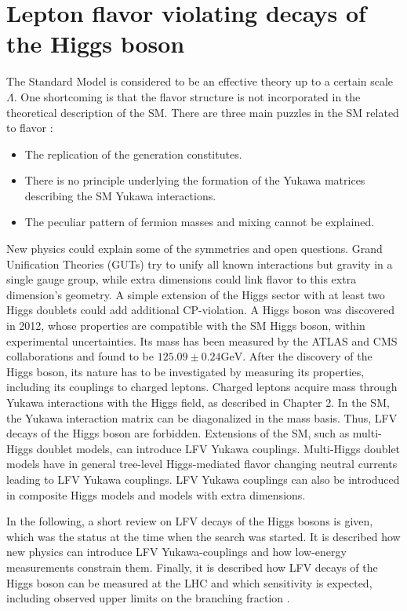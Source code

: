 \section{Lepton flavor violating decays of the Higgs boson}
The Standard Model is considered to be an effective theory up to a certain scale $\Lambda$. One shortcoming is that the flavor structure is not incorporated in the theoretical description of the SM.
There are three main puzzles in the SM related to flavor \cite{Raidal:2008jk}:
\begin{itemize}
\item The replication of the generation constitutes.
\item There is no principle underlying the formation of the Yukawa matrices describing the SM Yukawa interactions.
\item The peculiar pattern of fermion masses and mixing cannot be explained.
\end{itemize}
New physics could explain some of the symmetries and open questions. Grand Unification Theories (GUTs) try to unify all known interactions but gravity in a single gauge group, while extra dimensions could link flavor to this extra dimension's geometry. A simple extension of the Higgs sector with at least two Higgs doublets could add additional CP-violation. A Higgs boson was discovered in 2012, whose properties are compatible with the SM Higgs boson, within experimental uncertainties. Its mass has been measured by the ATLAS and CMS collaborations and found to be $125.09 \pm 0.24 \mathrm{GeV}$. After the discovery of the Higgs boson, its nature has to be investigated by measuring its properties, including its couplings to charged leptons. Charged leptons acquire mass through Yukawa interactions with the Higgs field, as described in Chapter 2. In the SM, the Yukawa interaction matrix can be diagonalized in the mass basis. Thus, LFV decays of the Higgs boson are forbidden. Extensions of the SM, such as multi-Higgs doublet models, can introduce LFV Yukawa couplings. Multi-Higgs doublet models have in general tree-level Higgs-mediated flavor changing neutral currents leading to LFV Yukawa couplings. LFV Yukawa couplings can also be introduced in composite Higgs models \cite{Blankenburg:2012ex} and models with extra dimensions.

In the following, a short review on LFV decays of the Higgs bosons is given, which was the status at the time when the search was started. It is described how new physics can introduce LFV Yukawa-couplings and how low-energy measurements constrain them. Finally, it is described how LFV decays of the Higgs boson can be measured at the LHC and which sensitivity is expected, including observed upper limits on the branching fraction \cite{Khachatryan:2015kon}.

